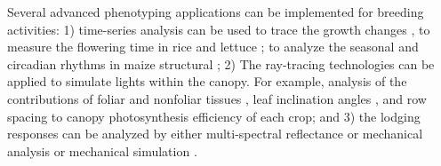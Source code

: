 Several advanced phenotyping applications can be implemented for breeding activities: 1) time-series analysis can be used to trace the growth changes \citep{li_analyzing_2013}, to measure the flowering time in rice \citep{guo_automated_2015} and lettuce \citep{han_drone_2021}; to analyze the seasonal and circadian rhythms in maize structural \citep{jin_exploring_2021}; 2) The ray-tracing technologies can be applied to simulate lights within the canopy. For example, analysis of the contributions of foliar and nonfoliar tissues \citep{chang_3dcap_2022}, leaf inclination angles \citep{liu_canopy_2021}, and row spacing \citep{he_modeling_2021} to canopy photosynthesis efficiency of each crop; and 3) the lodging responses can be analyzed by either multi-spectral reflectance \citep{wang_detection_2021, wang_classification_2021} or mechanical analysis \citep{cook_darling_2019, robertson_maize_2017} or mechanical simulation \citep{nakashima_non-destructive_2023}.


